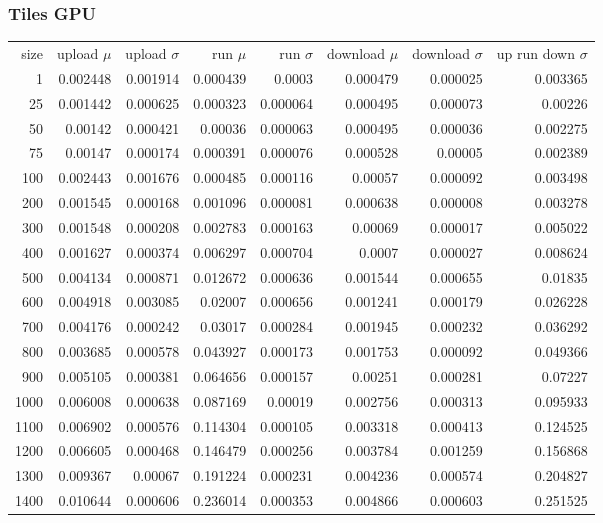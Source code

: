 \subsubsection{Tiles GPU}

\begin{tabular}{r r r r r r r r}
size & upload $\mu$  & upload $\sigma$ & run $\mu$ & run $\sigma$ & download $\mu$ & download $\sigma$ & up run down $\sigma$ \\
1 & 0.002448 & 0.001914 & 0.000439 & 0.0003 & 0.000479 & 0.000025 & 0.003365 \\
25 & 0.001442 & 0.000625 & 0.000323 & 0.000064 & 0.000495 & 0.000073 & 0.00226 \\
50 & 0.00142 & 0.000421 & 0.00036 & 0.000063 & 0.000495 & 0.000036 & 0.002275 \\
75 & 0.00147 & 0.000174 & 0.000391 & 0.000076 & 0.000528 & 0.00005 & 0.002389 \\
100 & 0.002443 & 0.001676 & 0.000485 & 0.000116 & 0.00057 & 0.000092 & 0.003498 \\
200 & 0.001545 & 0.000168 & 0.001096 & 0.000081 & 0.000638 & 0.000008 & 0.003278 \\
300 & 0.001548 & 0.000208 & 0.002783 & 0.000163 & 0.00069 & 0.000017 & 0.005022 \\
400 & 0.001627 & 0.000374 & 0.006297 & 0.000704 & 0.0007 & 0.000027 & 0.008624 \\
500 & 0.004134 & 0.000871 & 0.012672 & 0.000636 & 0.001544 & 0.000655 & 0.01835 \\
600 & 0.004918 & 0.003085 & 0.02007 & 0.000656 & 0.001241 & 0.000179 & 0.026228 \\
700 & 0.004176 & 0.000242 & 0.03017 & 0.000284 & 0.001945 & 0.000232 & 0.036292 \\
800 & 0.003685 & 0.000578 & 0.043927 & 0.000173 & 0.001753 & 0.000092 & 0.049366 \\
900 & 0.005105 & 0.000381 & 0.064656 & 0.000157 & 0.00251 & 0.000281 & 0.07227 \\
1000 & 0.006008 & 0.000638 & 0.087169 & 0.00019 & 0.002756 & 0.000313 & 0.095933 \\
1100 & 0.006902 & 0.000576 & 0.114304 & 0.000105 & 0.003318 & 0.000413 & 0.124525 \\
1200 & 0.006605 & 0.000468 & 0.146479 & 0.000256 & 0.003784 & 0.001259 & 0.156868 \\
1300 & 0.009367 & 0.00067 & 0.191224 & 0.000231 & 0.004236 & 0.000574 & 0.204827 \\
1400 & 0.010644 & 0.000606 & 0.236014 & 0.000353 & 0.004866 & 0.000603 & 0.251525 \\

\end{tabular}
